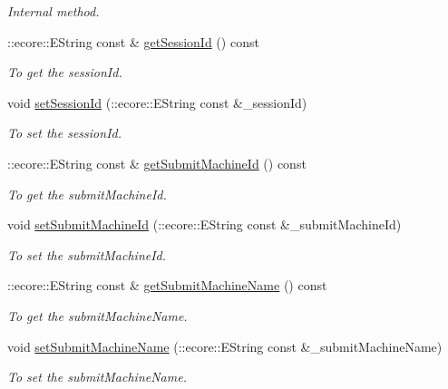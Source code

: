 \begin{DoxyCompactItemize}
\begin{DoxyCompactList}\small\item\em Internal method. \item\end{DoxyCompactList}\item 
::ecore::EString const \& \hyperlink{classTMS__Data_1_1Job_a7b87f65251aac6c3a5d42287c012629c}{getSessionId} () const 
\begin{DoxyCompactList}\small\item\em To get the sessionId. \item\end{DoxyCompactList}\item 
void \hyperlink{classTMS__Data_1_1Job_a30c6b04194777f1aee490d0e8223138d}{setSessionId} (::ecore::EString const \&\_\-sessionId)
\begin{DoxyCompactList}\small\item\em To set the sessionId. \item\end{DoxyCompactList}\item 
::ecore::EString const \& \hyperlink{classTMS__Data_1_1Job_aafe7384511bf099717a5fdcaf7b449d4}{getSubmitMachineId} () const 
\begin{DoxyCompactList}\small\item\em To get the submitMachineId. \item\end{DoxyCompactList}\item 
void \hyperlink{classTMS__Data_1_1Job_ab7831ef2aeeec21175eef3e03dd14ce6}{setSubmitMachineId} (::ecore::EString const \&\_\-submitMachineId)
\begin{DoxyCompactList}\small\item\em To set the submitMachineId. \item\end{DoxyCompactList}\item 
::ecore::EString const \& \hyperlink{classTMS__Data_1_1Job_a8d26a6c5484d2c0e94a50d9ae4605ebc}{getSubmitMachineName} () const 
\begin{DoxyCompactList}\small\item\em To get the submitMachineName. \item\end{DoxyCompactList}\item 
void \hyperlink{classTMS__Data_1_1Job_ade252e1608ebcfd69bdc361b0f6743e0}{setSubmitMachineName} (::ecore::EString const \&\_\-submitMachineName)
\begin{DoxyCompactList}\small\item\em To set the submitMachineName. \item\end{DoxyCompactList}\item 

\end{DoxyCompactItemize}
